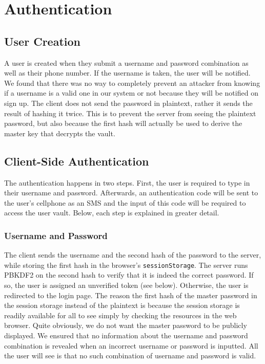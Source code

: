 \documentclass{article}
\begin{document}
\section{Authentication}

\subsection{User Creation}
\par A user is created when they submit a username and password combination as well as their phone number. If the username is taken, the user will be notified. We found that there was no way to completely prevent an attacker from knowing if a username is a valid one in our system or not because they will be notified on sign up. The client does not send the password in plaintext, rather it sends the result of hashing it twice. This is to prevent the server from seeing the plaintext password, but also because the first hash will actually be used to derive the master key that decrypts the vault.

\subsection{Client-Side Authentication}
\par The authentication happens in two steps. First, the user is required to type in their username and password. Afterwards, an authentication code will be sent to the user's cellphone as an SMS and the input of this code will be required to access the user vault. Below, each step is explained in greater detail.

\subsubsection{Username and Password}
\par The client sends the username and the second hash of the password to the server, while storing the first hash in the browser's \texttt{sessionStorage}. The server runs PBKDF2 on the second hash to verify that it is indeed the correct password. If so, the user is assigned an unverified token (see below). Otherwise, the user is redirected to the login page. The reason the first hash of the master password in the session storage instead of the plaintext is because the session storage is readily available for all to see simply by checking the resources in the web browser. Quite obviously, we do not want the master password to be publicly displayed. We ensured that no information about the username and password combination is revealed when an incorrect username or password is inputted. All the user will see is that no such combination of username and password is valid.
\end{document}
